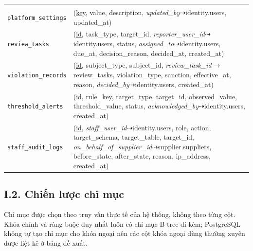 \begin{longtable}{L{3.10cm} L{11.90cm}}
 \\
\texttt{platform\_\allowbreak{}settings} & (\underline{key}, value, description, \textit{updated\_\allowbreak{}by}$\dashrightarrow$identity.users, updated\_\allowbreak{}at) \\
\texttt{review\_\allowbreak{}tasks} & (\underline{id}, task\_\allowbreak{}type, target\_\allowbreak{}id, \textit{reporter\_\allowbreak{}user\_\allowbreak{}id}$\dashrightarrow$identity.users, status, \textit{assigned\_\allowbreak{}to}$\dashrightarrow$identity.users, due\_\allowbreak{}at, decision\_\allowbreak{}reason, decided\_\allowbreak{}at, created\_\allowbreak{}at) \\
\texttt{violation\_\allowbreak{}records} & (\underline{id}, subject\_\allowbreak{}type, subject\_\allowbreak{}id, \textit{review\_\allowbreak{}task\_\allowbreak{}id}$\rightarrow$review\_\allowbreak{}tasks, violation\_\allowbreak{}type, sanction, effective\_\allowbreak{}at, reason, \textit{decided\_\allowbreak{}by}$\dashrightarrow$identity.users, created\_\allowbreak{}at) \\
\texttt{threshold\_\allowbreak{}alerts} & (\underline{id}, rule\_\allowbreak{}key, target\_\allowbreak{}type, target\_\allowbreak{}id, observed\_\allowbreak{}value, threshold\_\allowbreak{}value, status, \textit{acknowledged\_\allowbreak{}by}$\dashrightarrow$identity.users, created\_\allowbreak{}at) \\
\texttt{staff\_\allowbreak{}audit\_\allowbreak{}logs} & (\underline{id}, \textit{staff\_\allowbreak{}user\_\allowbreak{}id}$\dashrightarrow$identity.users, role, action, target\_\allowbreak{}schema, target\_\allowbreak{}table, target\_\allowbreak{}id, \textit{on\_\allowbreak{}behalf\_\allowbreak{}of\_\allowbreak{}supplier\_\allowbreak{}id}$\dashrightarrow$supplier.suppliers, before\_\allowbreak{}state, after\_\allowbreak{}state, reason, ip\_\allowbreak{}address, created\_\allowbreak{}at) \\
\end{longtable}
\endgroup

\subsection*{I.2. Chiến lược chỉ mục}

Chỉ mục được chọn theo truy vấn thực tế của hệ thống, không theo từng cột. Khóa chính và ràng buộc duy nhất luôn có chỉ mục B-tree đi kèm; PostgreSQL không tự tạo chỉ mục cho khóa ngoại nên các cột khóa ngoại dùng thường xuyên được liệt kê ở bảng đề xuất.

